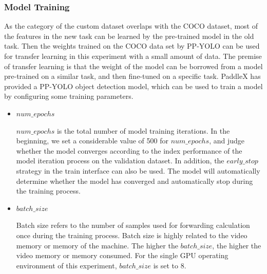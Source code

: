 \documentclass[sensors,article,submit,moreauthors,pdftex]{Definitions/mdpi}
\begin{document}
\begin{paracol}{2}
\linenumbers
\switchcolumn

\subsubsection{Model Training}

 As the category of the custom dataset overlaps with the COCO dataset, most of the features in the new task can be learned by the pre-trained model in the old task. Then the weights trained on the COCO data set by PP-YOLO can be used for transfer learning in this experiment with a small amount of data. The premise of transfer learning is that the weight of the model can be borrowed from a model pre-trained on a similar task, and then fine-tuned on a specific task. PaddleX has provided a PP-YOLO object detection model, which can be used to train a model by configuring some training parameters.

\begin{itemize}
\item{$num\_epochs$}

$num\_epochs$ is the total number of model training iterations. In the beginning, we set a considerable value of 500 for $num\_epochs$, and judge whether the model converges according to the index performance of the model iteration process on the validation dataset. In addition, the $early\_stop$ strategy in the train interface can also be used. The model will automatically determine whether the model has converged and automatically stop during the training process.

\end{itemize}

\begin{itemize}
\item{$batch\_size$}

Batch size refers to the number of samples used for forwarding calculation once during the training process. Batch size is highly related to the video memory or memory of the machine. The higher the $batch\_size$, the higher the video memory or memory consumed. For the single GPU operating environment of this experiment, $batch\_size$ is set to 8.
\end{itemize}




\end{paracol}
\end{document}
